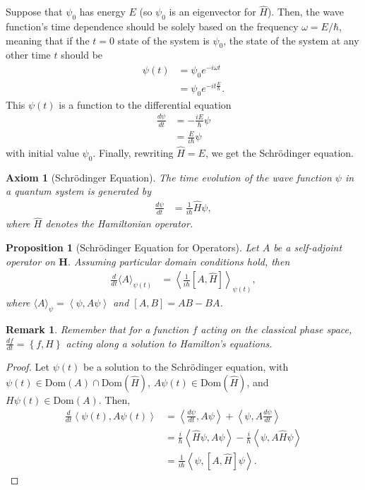 \documentclass[12pt]{extarticle}
\newtheorem*{remark}{Remark}
\newcommand{\set}[1]{\left\{#1\right\}}
\newcommand{\iprod}[2]{\left\langle #1,#2\right\rangle}
\theoremstyle{plain}
\newtheorem*{axiom}{Axiom}%
\newtheorem*{proposition}{Proposition}%
\theoremstyle{definition}
\theoremstyle{remark}
\begin{document}
  Suppose that $\psi_0$ has energy $E$ (so $\psi_0$ is an eigenvector for $\hat{H}$). Then, the wave function's time dependence should be solely based on the frequency $\omega = E/\hbar$, meaning that if the $t=0$ state of the system is $\psi_0$, the state of the system at any other time $t$ should be
  \begin{align*}
    \psi(t) &= \psi_0 e^{-i\omega t}\\
            &= \psi_0 e^{-it\frac{E}{\hbar}}.
  \end{align*}
  This $\psi(t)$ is a function to the differential equation
  \begin{align*}
    \frac{d\psi}{dt} &= -\frac{iE}{\hbar}\psi\\
                     &= \frac{E}{i\hbar}\psi
  \end{align*}
  with initial value $\psi_0$. Finally, rewriting $\hat{H} = E$, we get the Schrödinger equation.
  \begin{axiom}[Schrödinger Equation]
    The time evolution of the wave function $\psi$ in a quantum system is generated by
    \begin{align*}
      \frac{d\psi}{dt} &= \frac{1}{i\hbar}\hat{H}\psi,
    \end{align*}
    where $\hat{H}$ denotes the Hamiltonian operator.
  \end{axiom}
  \begin{proposition}[Schrödinger Equation for Operators]
    Let $A$ be a self-adjoint operator on $\mathbf{H}$. Assuming particular domain conditions hold, then
    \begin{align*}
      \frac{d}{dt}\langle A\rangle_{\psi(t)} &= \left\langle \frac{1}{i\hbar}[A,\hat{H}]\right\rangle_{\psi(t)},
    \end{align*}
    where $\langle A \rangle_{\psi} = \iprod{\psi}{A\psi}$ and $[A,B] = AB-BA$.
  \end{proposition}
  \begin{remark}
    Remember that for a function $f$ acting on the classical phase space, $\frac{df}{dt} = \set{f,H}$ acting along a solution to Hamilton's equations.
  \end{remark}
  \begin{proof}
    Let $\psi(t)$ be a solution to the Schrödinger equation, with $\psi(t) \in \text{Dom}(A) \cap \text{Dom}(\hat{H})$, $A\psi(t) \in \text{Dom}(\hat{H})$, and $H\psi(t) \in \text{Dom}(A)$. Then,
    \begin{align*}
      \frac{d}{dt}\iprod{\psi(t)}{A\psi(t)} &= \iprod{\frac{d\psi}{dt}}{A\psi} + \iprod{\psi}{A\frac{d\psi}{dt}}\\
                                            &= \frac{i}{\hbar}\iprod{\hat{H}\psi}{A\psi} - \frac{i}{\hbar}\iprod{\psi}{A\hat{H}\psi}\\
                                            &= \frac{1}{i\hbar}\iprod{\psi}{[A,\hat{H}]\psi}.
    \end{align*}
  \end{proof}
\end{document}
